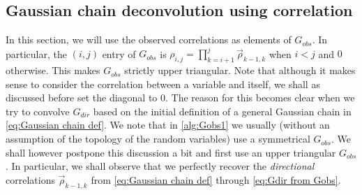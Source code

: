 \documentclass[../Thesis.tex]{subfiles}
\begin{document}
\subsection{Gaussian chain deconvolution using correlation}
In this section, we will use the observed correlations as elements of $G_{obs}$. In particular, the $(i,j)$ entry of $G_{obs}$ is $\rho_{i,j} = \prod_{k=i+1}^{j} \vec{\rho}_{k-1,k}$ when $i< j$ and $0$ otherwise. This makes $G_{obs}$ strictly upper triangular. Note that although it makes sense to consider the correlation between a variable and itself, we shall as discussed before set the diagonal to $0$. The reason for this becomes clear when we try to convolve $G_{dir}$ based on the initial definition of a general Gaussian chain in \autoref{eq:Gaussian chain def}. We note that in \autoref{alg:Gobs1} we usually (without an assumption of the topology of the random variables) use a symmetrical $G_{obs}$. We shall however postpone this discussion a bit and first use an upper triangular $G_{obs}$. In particular, we shall observe that we perfectly recover the \textit{directional} correlations $\vec{\rho}_{k-1,k}$ from \autoref{eq:Gaussian chain def} through \autoref{eq:Gdir from Gobs}.
\end{document}
